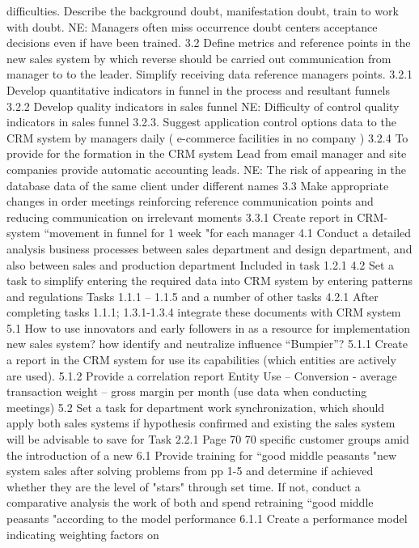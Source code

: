 difficulties. Describe the background
doubt, manifestation
doubt, train to work with doubt.
NE: Managers often
miss occurrence
doubt centers acceptance
decisions even if
have been trained.
3.2
Define metrics and
reference points in the new
sales system by which
reverse should be carried out
communication from manager to
to the leader. Simplify
receiving data
reference managers
points.
3.2.1
Develop quantitative indicators in
funnel in the process and resultant funnels
3.2.2
Develop quality indicators in
sales funnel
NE: Difficulty of control
quality indicators in
sales funnel
3.2.3. Suggest application control options
data to the CRM system by managers
daily ( e-commerce facilities in
no company )
3.2.4
To provide for the formation in the CRM system
Lead from email manager and site
companies provide automatic accounting
leads.
NE: The risk of appearing in the database
data of the same
client under different
names
3.3
Make appropriate
changes in order
meetings reinforcing
reference communication
points and reducing
communication on
irrelevant moments
3.3.1
Create report in CRM-system “movement in
funnel for 1 week "for each
manager
4.1
Conduct a detailed analysis
business processes between
sales department and
design department, and
also between sales and
production department
Included in task 1.2.1
4.2
Set a task to simplify
entering the required data into
CRM system by entering patterns and
regulations
Tasks 1.1.1 -- 1.1.5 and a number of other tasks
4.2.1
After completing tasks 1.1.1; 1.3.1-1.3.4
integrate these documents with
CRM system
5.1
How to use innovators and
early followers in
as a resource for implementation
new sales system? how
identify and
neutralize influence
“Bumpier”?
5.1.1
Create a report in the CRM system for use
its capabilities (which entities are actively
are used).
5.1.2
Provide a correlation report
Entity Use -- Conversion -
average transaction weight -- gross margin per month
(use data when conducting
meetings)
5.2
Set a task for
department work synchronization,
which should apply both
sales systems if hypothesis
confirmed and existing
the sales system will be
advisable to save for
Task 2.2.1
Page 70
70
specific customer groups
amid the introduction of a new
6.1
Provide training for “good
middle peasants "new system
sales after solving problems from
pp 1-5 and determine if achieved
whether they are the level of "stars" through
set time. If not,
conduct a comparative analysis
the work of both and spend
retraining “good
middle peasants "according to the model
performance
6.1.1
Create a performance model indicating
weighting factors on
